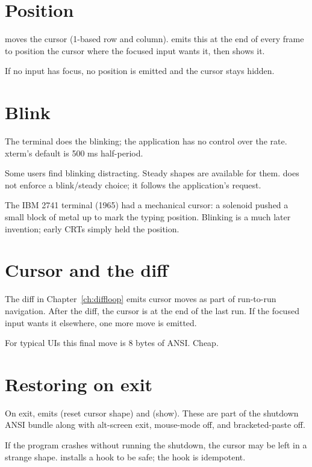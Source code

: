\section{Position}

\code{ESC [ y ; x H} moves the cursor (1-based row and column).
\maya{} emits this at the end of every frame to position the
cursor where the focused input wants it, then shows it.

If no input has focus, no position is emitted and the cursor
stays hidden.

\section{Blink}

The terminal does the blinking; the application has no
control over the rate. xterm's default is 500 ms half-period.

Some users find blinking distracting. Steady shapes are
available for them. \maya{} does not enforce a blink/steady
choice; it follows the application's request.

\begin{funfact}
The IBM 2741 terminal (1965) had a mechanical cursor: a
solenoid pushed a small block of metal up to mark the
typing position. Blinking is a much later invention; early
CRTs simply held the position.
\end{funfact}

\section{Cursor and the diff}

The diff in Chapter~\ref{ch:diffloop} emits cursor moves as part
of run-to-run navigation. After the diff, the cursor is at the
end of the last run. If the focused input wants it elsewhere,
one more move is emitted.

For typical UIs this final move is 8 bytes of ANSI. Cheap.

\section{Restoring on exit}

On exit, \maya{} emits \code{ESC [ 0 q} (reset cursor shape)
and \code{ESC [ ? 25 h} (show). These are part of the
shutdown ANSI bundle along with alt-screen exit, mouse-mode
off, and bracketed-paste off.

If the program crashes without running the shutdown, the
cursor may be left in a strange shape. \maya{} installs a
 hook to be safe; the hook is idempotent.

